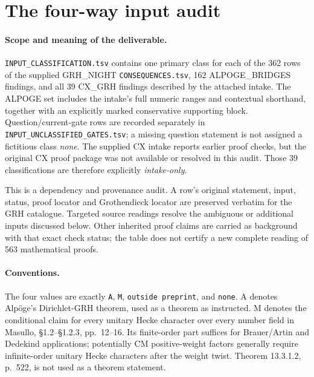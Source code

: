 \section{The four-way input audit}
\label{sec:input-audit}

\paragraph{Scope and meaning of the deliverable.}
\texttt{INPUT\_CLASSIFICATION.tsv} contains one primary class for each
of the 362 rows of the supplied GRH\_NIGHT
\texttt{CONSEQUENCES.tsv}, 162 ALPOGE\_BRIDGES findings, and all 39
CX\_GRH findings described by the attached intake.  The ALPOGE set
includes the intake's full numeric ranges and contextual shorthand,
together with an explicitly marked conservative supporting block.
Question/current-gate rows are recorded separately in
\texttt{INPUT\_UNCLASSIFIED\_GATES.tsv}; a missing question statement is
not assigned a fictitious class \emph{none}.  The supplied CX intake
reports earlier proof checks, but the original CX proof package was not
available or resolved in this audit.  Those 39 classifications are
therefore explicitly \emph{intake-only}.

This is a dependency and provenance audit.  A row's original statement,
input, status, proof locator and Grothendieck locator are preserved
verbatim for the GRH catalogue.  Targeted source readings resolve the
ambiguous or additional inputs discussed below.  Other inherited proof
claims are carried as background with that exact check status; the table
does not certify a new complete reading of 563 mathematical proofs.

\paragraph{Conventions.}
The four values are exactly \texttt{A}, \texttt{M},
\texttt{outside preprint}, and \texttt{none}.  A denotes Alp\"oge's
Dirichlet-GRH theorem, used as a theorem as instructed.  M denotes the
conditional claim for every unitary Hecke character over every number
field in Masullo, \S1.2--\S1.2.3, pp.~12--16.  Its finite-order part
suffices for Brauer/Artin and Dedekind applications; potentially CM
positive-weight factors generally require infinite-order unitary Hecke
characters after the weight twist.  Theorem 13.3.1.2, p.~522, is not used
as a theorem statement.


